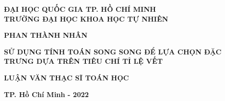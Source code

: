 \begin{titlepage}
\begin{center}
{\bf  ĐẠI HỌC QUỐC GIA TP. HỒ CHÍ MINH}\\
{\bf TRƯỜNG ĐẠI HỌC KHOA HỌC TỰ NHIÊN}\\
\hfill

\vspace*{2cm}

{\large\bf  PHAN THÀNH NHÂN}

\vspace*{3cm}

{\LARGE\bf SỬ DỤNG TÍNH TOÁN SONG SONG ĐỂ LỰA CHỌN ĐẶC TRƯNG DỰA TRÊN TIÊU CHÍ TỈ LỆ VẾT	}

\vspace*{3cm}

{\large\bf LUẬN VĂN THẠC SĨ TOÁN HỌC}


\vfill

{\bf TP. Hồ Chí Minh - 2022}
\end{center}
\end{titlepage}

